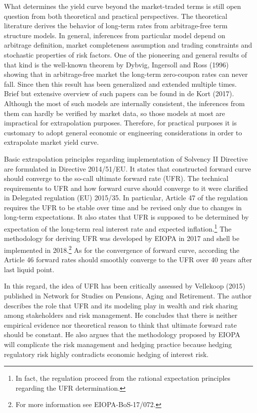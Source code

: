 	What determines the yield curve beyond the market-traded terms is still open question from both theoretical and practical perspectives. 
	The theoretical literature derives the behavior of long-term rates from arbitrage-free  term structure models. 
	In general, inferences from particular model depend on  arbitrage definition, market completeness assumption and trading constraints and stochastic properties of risk factors. 
	One of the pioneering and general results of that kind is the well-known theorem by Dybvig, Ingersoll and Ross (1996) showing that in arbitrage-free market the long-term zero-coupon rates can never fall. 
	Since then this result has been generalized and extended multiple times. 
	Brief but extensive overview of such papers can be found in de Kort (2017). 
	Although the most of such models are internally consistent, the inferences from them can hardly be verified by market data, so those models at most are impractical for extrapolation purposes. 
	Therefore, for practical purposes it is customary to adopt general economic or engineering considerations in order to extrapolate market yield curve. 	
 
	Basic extrapolation principles regarding implementation of Solvency II Directive are formulated in Directive 2014/51/EU. 
	It states that constructed forward curve should converge to the so-call ultimate forward rate (UFR). 
	The technical requirements to UFR and how forward curve should converge to it were clarified in Delegated regulation (EU) 2015/35.  
	In particular, Article 47 of the regulation requires the UFR to be stable over time and be revised only due to changes in long-term expectations.
	It also states that UFR is supposed to be determined by expectation of the long-term real interest rate and expected inflation.\footnote
{
	In fact, the regulation proceed from the rational expectation principles regarding the UFR determination.  
}
	The methodology for deriving UFR was developed by EIOPA in 2017 and shell be implemented in 2018.\footnote
{
For more information see EIOPA-BoS-17/072.
}    
	As for the convergence of forward curve, according the Article 46 forward rates should smoothly converge to the UFR over 40 years after last liquid point.
	
	In this regard, the idea of UFR has been critically assessed by Vellekoop (2015) published in Network for Studies on Pensions, Aging and Retirement. The author describes the role that UFR and its modeling play in wealth and risk sharing among stakeholders and risk management. He concludes that there is neither empirical evidence nor theoretical reason to think that ultimate forward rate should be constant. He also argues that the methodology proposed by EIOPA will complicate the risk management and hedging practice because hedging regulatory risk highly contradicts economic hedging of interest risk. 
	
